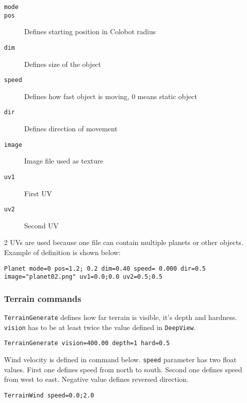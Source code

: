 
\begin{description}
    \item[\texttt{mode}] 
    \item[\texttt{pos}] Defines starting position in Colobot radius
    \item[\texttt{dim}] Defines size of the object
    \item[\texttt{speed}] Defines how fast object is moving, 0 means static object
    \item[\texttt{dir}] Defines direction of movement
    \item[\texttt{image}] Image file used as texture
    \item[\texttt{uv1}] First UV
    \item[\texttt{uv2}] Second UV
\end{description}

2 UVs are used because one file can contain multiple planets or other objects. Example of definition is shown below:

\begin{lstlisting}[style=scene]
Planet mode=0 pos=1.2; 0.2 dim=0.40 speed= 0.000 dir=0.5 image="planet02.png" uv1=0.0;0.0 uv2=0.5;0.5
\end{lstlisting}


\subsubsection{Terrain commands}

\texttt{TerrainGenerate} defines how far terrain is visible, it's depth and hardness. \texttt{vision} has to be at least twice the value defined in \texttt{DeepView}.

\begin{lstlisting}[style=scene]
TerrainGenerate vision=400.00 depth=1 hard=0.5
\end{lstlisting}

Wind velocity is defined in command below. \texttt{speed} parameter has two float values. First one defines speed from north to south. Second one defines speed from west to east. Negative value defines reversed direction.

\begin{lstlisting}[style=scene]
TerrainWind speed=0.0;2.0
\end{lstlisting}

